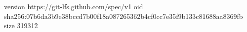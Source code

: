 version https://git-lfs.github.com/spec/v1
oid sha256:07b6da3b9e38bccd7b00f18a087265362b4cf0cc7e35f9b133c81688aa8369fb
size 319312
